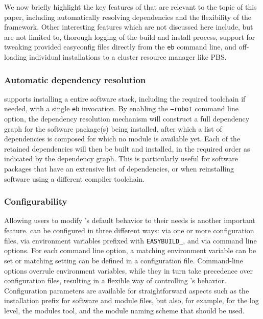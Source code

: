We now briefly highlight the key features of \easybuild{} that are relevant
to the topic of this paper, including automatically resolving dependencies and
the flexibility of the \easybuild{} framework. Other interesting features which are
not discussed here include, but are not limited to, thorough logging of the build
and install process, support for tweaking provided easyconfig files directly from
the \texttt{\small eb} command line, and off-loading individual installations to
a cluster resource manager like PBS.

\subsubsection{Automatic dependency resolution}
\label{sec:eb_dependency_resolution}

\easybuild{} supports installing a entire software stack, including the required
toolchain if needed, with a single \texttt{\small eb} invocation. By enabling the
\texttt{\small --robot} command line option, the dependency resolution mechanism will
construct a full dependency graph for the software package(s) being installed, after
which a list of dependencies is composed for which no module is available yet. Each of
the retained dependencies will then be built and installed, in the required order as
indicated by the dependency graph. This is particularly useful for software
packages that have an extensive list of dependencies, or when reinstalling software
using a different compiler toolchain.

\subsubsection{Configurability}
\label{sec:eb_configurability}

Allowing users to modify \easybuild{}'s default behavior to their needs is another
important feature. \easybuild{} can be configured in three different ways: via one or
more configuration files, via environment variables prefixed with
\texttt{\small EASYBUILD\_}, and via command line options. For each command line
option, a matching environment variable can be set or matching setting can be
defined in a configuration file. Command-line options overrule environment
variables, while they in turn take precedence over configuration files, resulting in a
flexible way of controlling \easybuild{}'s behavior.
Configuration parameters are available for straightforward aspects such as the
installation prefix for software and module files, but also, for example, for the
log level, the modules tool, and the module naming scheme that should be used.

